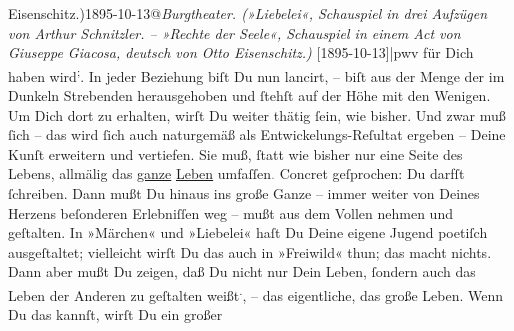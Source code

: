\begin{ledgroupsized}[t]{13cm}
{                  Eisenschitz.)1895-10-13@\emph{Burgtheater. (»Liebelei«, Schauspiel in drei Aufzügen von Arthur Schnitzler. – »Rechte der Seele«, Schauspiel in einem Act von Giuseppe Giacosa, deutsch von Otto Eisenschitz.)} {[}1895-10-13{]}|pwv} für Dich haben wird\substVorne{}\textsuperscript{;}\substDazwischen{}.\substHinten{} In jeder Beziehung biſt Du nun lancirt, – biſt aus der Menge der im Dunkeln
               Strebenden herausgehoben und ſtehſt auf der Höhe mit den Wenigen.\pend
           \pstart
           Um Dich dort zu erhalten, wirſt Du weiter thätig ſein, wie bisher. Und zwar muß ſich
               – das wird {\pb}ſich auch naturgemäß als
               Entwickelungs-Reſultat ergeben – Deine Kunſt erweitern und vertiefen. Sie muß, ſtatt
               wie bisher nur eine Seite des Lebens, allmälig das \uline{ganze}{ }\uline{Leben} umfaſſen\textcolor{gray}{.} Concret  geſprochen: Du darfſt \label{K_L02753-2v}\label{K_L02753-2h} ſchreiben. Dann mußt Du hinaus ins große Ganze – immer weiter von Deines
               Herzens beſonderen Erlebniſſen weg – mußt aus dem Vollen {\pb}nehmen und geſtalten. In »Märchen« und »Liebelei«
               haſt Du Deine eigene Jugend poetiſch ausgeſtaltet; vielleicht wirſt Du das auch in
                  »Freiwild« thun; das macht nichts. Dann aber
               mußt Du zeigen, daß Du nicht nur Dein Leben, ſondern auch das Leben  der Anderen zu geſtalten weißt\substVorne{}\textsuperscript{.}\substDazwischen{},\substHinten{} – das eigentliche, das große Leben. Wenn Du das kannſt, wirſt Du ein großer

\end{ledgroupsized}
